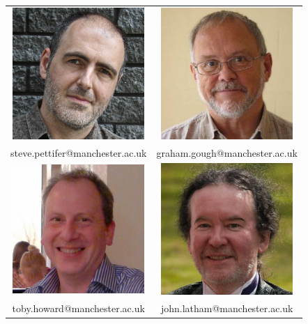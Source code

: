 \begin{firstonly}
\vspace{1.5cm}
\begin{table}[h]
\centering
\begin{tabular}{cc}
\includegraphics[width=5cm]{images/srp-mugshot} & \includegraphics[width=5cm]{images/gdg-mugshot} \\
{\small steve.pettifer@manchester.ac.uk} & {\small graham.gough@manchester.ac.uk} \\
\includegraphics[width=5cm]{images/tljh-mugshot} & \includegraphics[width=5cm]{images/jtl-mugshot3.jpg} \\
{\small toby.howard@manchester.ac.uk}  & {\small john.latham@manchester.ac.uk} \\
\end{tabular}
\end{table}

  
\end{firstonly}
